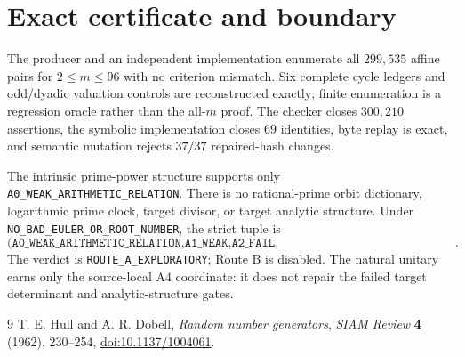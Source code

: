 \documentclass[10pt]{article}
\begin{document}
\section{Exact certificate and boundary}
The producer and an independent implementation enumerate all $299{,}535$
affine pairs for $2\le m\le96$ with no criterion mismatch.  Six complete
cycle ledgers and odd/dyadic valuation controls are reconstructed exactly;
finite enumeration is a regression oracle rather than the all-$m$ proof.
The checker closes $300{,}210$ assertions, the symbolic implementation closes
$69$ identities, byte replay is exact, and semantic mutation rejects
$37/37$ repaired-hash changes.

The intrinsic prime-power structure supports only
\texttt{A0\_WEAK\_ARITHMETIC\_RELATION}.  There is no rational-prime
orbit dictionary, logarithmic prime clock, target divisor, or target analytic
structure.  Under \texttt{NO\_BAD\_EULER\_OR\_ROOT\_NUMBER}, the strict
tuple is
\[
\texttt{(A0\_WEAK\_ARITHMETIC\_RELATION,A1\_WEAK,A2\_FAIL,
A3\_FAIL,A4\_NATURAL\_QUANTIZATION)}.
\]
The verdict is \texttt{ROUTE\_A\_EXPLORATORY}; Route B is disabled.
The natural unitary earns only the source-local A4 coordinate: it does not
repair the failed target determinant and analytic-structure gates.

\begin{thebibliography}{9}
 T. E. Hull and A. R. Dobell,
\emph{Random number generators}, \emph{SIAM Review} \textbf{4} (1962),
230--254, \href{https://doi.org/10.1137/1004061}{doi:10.1137/1004061}.
\end{thebibliography}
\end{document}
